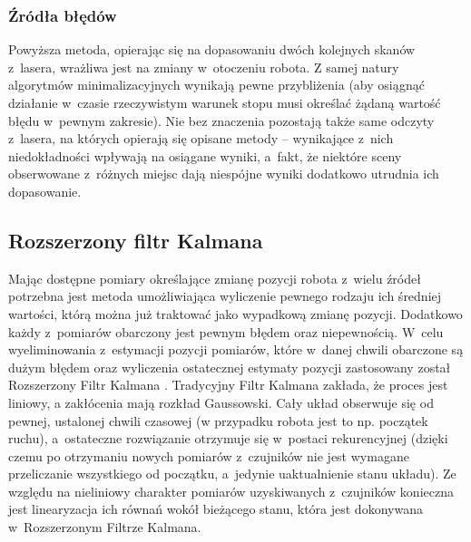 \subsubsection{Źródła błędów}

Powyższa metoda, opierając się na dopasowaniu dwóch kolejnych skanów z~lasera,
wrażliwa jest na zmiany w~otoczeniu robota. Z samej natury algorytmów
minimalizacyjnych wynikają pewne przybliżenia (aby osiągnąć działanie w~czasie
rzeczywistym warunek stopu musi określać żądaną wartość błędu w~pewnym
zakresie). Nie bez znaczenia pozostają także same odczyty z~lasera, na których
opierają się opisane metody -- wynikające z~nich niedokładności wpływają na
osiągane wyniki, a~fakt, że niektóre sceny obserwowane z~różnych miejsc dają
niespójne wyniki dodatkowo utrudnia ich dopasowanie.

\subsection{Rozszerzony filtr Kalmana}

Mając dostępne pomiary określające zmianę pozycji robota z~wielu źródeł potrzebna jest metoda
umożliwiająca wyliczenie pewnego rodzaju ich średniej wartości, którą można już traktować
jako wypadkową zmianę pozycji. Dodatkowo każdy z~pomiarów obarczony jest pewnym błędem oraz
niepewnością. W~celu wyeliminowania z~estymacji pozycji pomiarów, które w~danej chwili
obarczone są dużym błędem oraz wyliczenia ostatecznej estymaty pozycji zastosowany został
Rozszerzony Filtr Kalmana \cite{Thrun:2005:PR:1121596}. Tradycyjny Filtr Kalmana zakłada, że proces jest
liniowy, a zakłócenia mają rozkład Gaussowski. Cały układ obserwuje się od pewnej,
ustalonej chwili czasowej (w przypadku robota jest to np. początek ruchu), a~ostateczne
rozwiązanie otrzymuje się w~postaci rekurencyjnej (dzięki czemu po otrzymaniu nowych pomiarów
z~czujników nie jest wymagane przeliczanie wszystkiego od początku, a~jedynie uaktualnienie
stanu układu). Ze względu na nieliniowy charakter pomiarów uzyskiwanych z~czujników
konieczna jest linearyzacja ich równań wokół bieżącego stanu, która jest dokonywana
w~Rozszerzonym Filtrze Kalmana.


